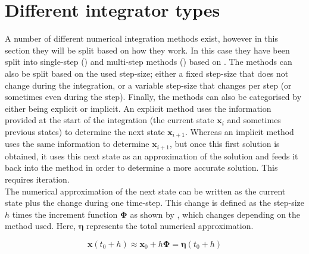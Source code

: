 \section{Different integrator types}
\label{sec:differentIntegratorTypes}
A number of different numerical integration methods exist, however in this section they will be split based on how they work. In this case they have been split into single-step () and multi-step methods () based on \cite{noomen2013int}. The methods can also be split based on the used step-size; either a fixed step-size that does not change during the integration, or a variable step-size that changes per step (or sometimes even during the step). Finally, the methods can also be categorised by either being explicit or implicit. An explicit method uses the information provided at the start of the integration (the current state $\mathbf{x}_{i}$ and sometimes previous states) to determine the next state $\mathbf{x}_{i+1}$. Whereas an implicit method uses the same information to determine $\mathbf{x}_{i+1}$, but once this first solution is obtained, it uses this next state as an approximation of the solution and feeds it back into the method in order to determine a more accurate solution. This requires iteration. \\
The numerical approximation of the next state can be written as the current state plus the change during one time-step. This change is defined as the step-size $h$ times the increment function 
$\mathbf{\Phi}$ as shown by , which changes depending on the method used. Here, $\mathbf{\eta}$ represents the total numerical approximation. 



\begin{equation} \label{eq:integration}
\mathbf{x}(t_{0}+h)\approx\mathbf{x}_{0}+h\bm{\Phi}=\mathbf{\eta}(t_{0}+h)
\end{equation}




